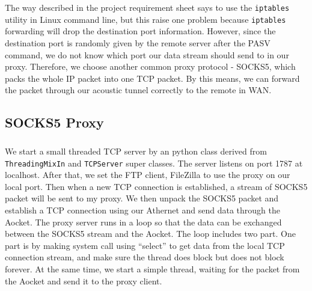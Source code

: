     The way described in the project requirement sheet says to use the {\tt iptables} utility in Linux command line, but this raise one problem because {\tt iptables} forwarding will drop the destination port information. However, since the destination port is randomly given by the remote server after the PASV command, we do not know which port our data stream should send to in our proxy. Therefore, we choose another common proxy protocol - SOCKS5, which packs the whole IP packet into one TCP packet. By this means, we can forward the packet through our acoustic tunnel correctly to the remote in WAN.

    \subsection{SOCKS5 Proxy}
        \subparagraph{}
        We start a small threaded TCP server by an python class derived from {\tt ThreadingMixIn} and {\tt TCPServer} super classes. The server listens on port 1787 at localhost. After that, we set the FTP client, FileZilla to use the proxy on our local port. Then when a new TCP connection is established, a stream of SOCKS5 packet will be sent to my proxy. We then unpack the SOCKS5 packet and establish a TCP connection using our Athernet and send data through the Aocket. The proxy server runs in a loop so that the data can be exchanged between the SOCKS5 stream and the Aocket. The loop includes two part. One part is by making system call using ``select'' to get data from the local TCP connection stream, and make sure the thread does block but does not block forever. At the same time, we start a simple thread, waiting for the packet from the Aocket and send it to the proxy client.
